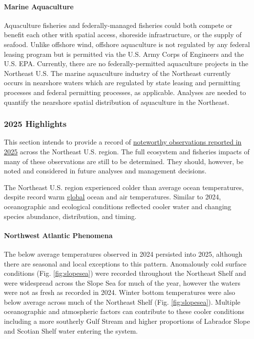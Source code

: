 \documentclass[
  10pt,
]{article}
\begin{document}
\paragraph{Marine Aquaculture}\label{marine-aquaculture}

Aquaculture fisheries and federally-managed fisheries could both compete or benefit each other with spatial access, shoreside infrastructure, or the supply of seafood. Unlike offshore wind, offshore aquaculture is not regulated by any federal leasing program but is permitted via the U.S. Army Corps of Engineers and the U.S. EPA. Currently, there are no federally-permitted aquaculture projects in the Northeast U.S. The marine aquaculture industry of the Northeast currently occurs in nearshore waters which are regulated by state leasing and permitting processes and federal permitting processes, as applicable. Analyses are needed to quantify the nearshore spatial distribution of aquaculture in the Northeast.

\subsubsection{2025 Highlights}\label{highlights}

This section intends to provide a record of \href{https://noaa-edab.github.io/catalog/observation_synthesis_2025.html}{noteworthy observations reported in 2025} across the Northeast U.S. region. The full ecosystem and fisheries impacts of many of these observations are still to be determined. They should, however, be noted and considered in future analyses and management decisions.

The Northeast U.S. region experienced colder than average ocean temperatures, despite record warm \href{https://www.ncei.noaa.gov/news/global-climate-202513}{global} ocean and air temperatures. Similar to 2024, oceanographic and ecological conditions reflected cooler water and changing species abundance, distribution, and timing.

\paragraph{Northwest Atlantic Phenomena}\label{northwest-atlantic-phenomena}

The below average temperatures observed in 2024 persisted into 2025, although there are seasonal and local exceptions to this pattern. Anomalously cold surface conditions (Fig. \ref{fig:slopesea}) were recorded throughout the Northeast Shelf and were widespread across the Slope Sea for much of the year, however the waters were not as fresh as recorded in 2024. Winter bottom temperatures were also below average across much of the Northeast Shelf (Fig. \ref{fig:slopesea}). Multiple oceanographic and atmospheric factors can contribute to these cooler conditions including a more southerly Gulf Stream and higher proportions of Labrador Slope and Scotian Shelf water entering the system.
\end{document}

